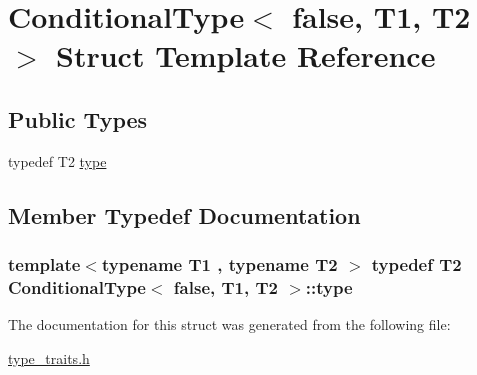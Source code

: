 \hypertarget{struct_conditional_type_3_01false_00_01_t1_00_01_t2_01_4}{}\section{Conditional\+Type$<$ false, T1, T2 $>$ Struct Template Reference}
\label{struct_conditional_type_3_01false_00_01_t1_00_01_t2_01_4}
\subsection*{Public Types}
\begin{DoxyCompactItemize}
\item 
typedef T2 \hyperlink{struct_conditional_type_3_01false_00_01_t1_00_01_t2_01_4_a45a9972b242655c66da3cb35a8180f76}{type}
\end{DoxyCompactItemize}


\subsection{Member Typedef Documentation}
\subsubsection[{\texorpdfstring{type}{type}}]{\setlength{\rightskip}{0pt plus 5cm}template$<$typename T1 , typename T2 $>$ typedef T2 {\bf Conditional\+Type}$<$ false, T1, T2 $>$\+::{\bf type}}\hypertarget{struct_conditional_type_3_01false_00_01_t1_00_01_t2_01_4_a45a9972b242655c66da3cb35a8180f76}{}\label{struct_conditional_type_3_01false_00_01_t1_00_01_t2_01_4_a45a9972b242655c66da3cb35a8180f76}


The documentation for this struct was generated from the following file\+:\begin{DoxyCompactItemize}
\item 
\hyperlink{type__traits_8h}{type\+\_\+traits.\+h}\end{DoxyCompactItemize}

